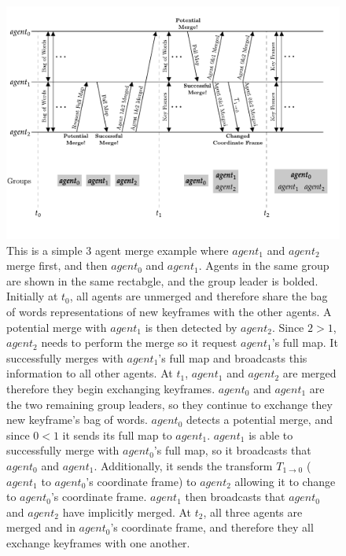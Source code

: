 \begin{figure}[h]
    \centering
    \includegraphics[]{figures/3_agent_merge.pdf}

    \caption{This is a simple 3 agent merge example where $agent_1$ and $agent_2$ merge first, and then $agent_0$ and $agent_1$. Agents in the same group are shown in the same rectabgle, and the group leader is bolded. \captionbreak Initially at $t_0$, all agents are unmerged and therefore share the bag of words representations of new keyframes with the other agents. A potential merge with $agent_1$ is then detected by $agent_2$. Since $2>1$, $agent_2$ needs to perform the merge so it request $agent_1$'s full map. It successfully merges with $agent_1$'s full map and broadcasts this information to all other agents. \captionbreak At $t_1$, $agent_1$ and $agent_2$ are merged therefore they begin exchanging keyframes. $agent_0$ and $agent_1$ are the two remaining group leaders, so they continue to exchange they new keyframe's bag of words. $agent_0$ detects a potential merge, and since $0<1$ it sends its full map to $agent_1$. $agent_1$ is able to successfully merge with $agent_0$'s full map, so it broadcasts that $agent_0$ and $agent_1$. Additionally, it sends the transform $T_{1 \to 0}$ ($agent_1$ to $agent_0$'s coordinate frame) to $agent_2$ allowing it to change to $agent_0$'s coordinate frame. $agent_1$ then broadcasts that $agent_0$ and $agent_2$ have implicitly merged. \captionbreak At $t_2$, all three agents are merged and in $agent_0$'s coordinate frame, and therefore they all exchange keyframes with one another.}
    \label{fig:3-agent-merge}
\end{figure}

